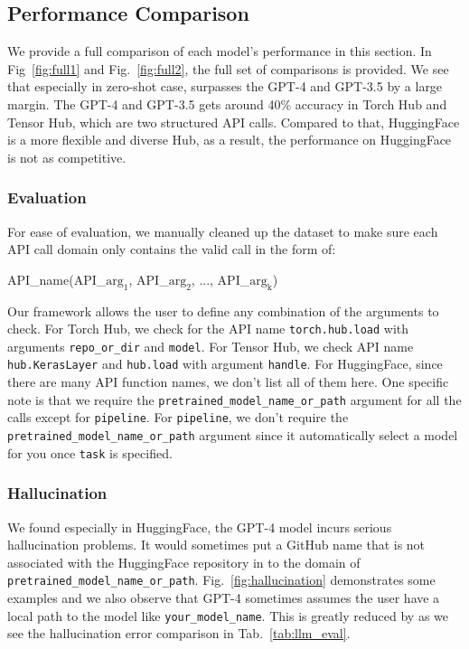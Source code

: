 \subsection{Performance Comparison}
We provide a full comparison of each model's performance in this section. In Fig~\ref{fig:full1} and Fig.~\ref{fig:full2}, the full set of comparisons is provided. We see that especially in zero-shot case, \gorilla{} surpasses the GPT-4 and GPT-3.5 by a large margin. The GPT-4 and GPT-3.5 gets around 40\% accuracy in Torch Hub and Tensor Hub, which are two structured API calls. Compared to that, HuggingFace is a more flexible and diverse Hub, as a result, the performance on HuggingFace is not as competitive.

\subsubsection{Evaluation}
For ease of evaluation, we manually cleaned up the dataset to make sure each API call domain only contains the valid call in the form of: 
\begin{tcolorbox}
\centering
    API\_name(API\_$\mathrm{arg_{1}}$, API\_$\mathrm{arg_{2}}$, ..., API\_$\mathrm{arg_{k}}$)
\end{tcolorbox}
Our framework allows the user to define any combination of the arguments to check. For Torch Hub, we check for the API name \texttt{torch.hub.load} with arguments \texttt{repo\_or\_dir} and \texttt{model}. For Tensor Hub, we check API name \texttt{hub.KerasLayer} and \texttt{hub.load} with argument \texttt{handle}. For HuggingFace, since there are many API function names, we don't list all of them here. One specific note is that we require the \texttt{pretrained\_model\_name\_or\_path} argument for all the calls except for \texttt{pipeline}. For \texttt{pipeline}, we don't require the \texttt{pretrained\_model\_name\_or\_path} argument since it automatically select a model for you once \texttt{task} is specified.  

\subsubsection{Hallucination}
We found especially in HuggingFace, the GPT-4 model incurs serious hallucination problems. It would sometimes put a GitHub name that is not associated with the HuggingFace repository in to the domain of \texttt{pretrained\_model\_name\_or\_path}. Fig.~\ref{fig:hallucination} demonstrates some examples and we also observe that GPT-4 sometimes assumes the user have a local path to the model like \texttt{your\_model\_name}. This is greatly reduced by \gorilla{} as we see the hallucination error comparison in Tab.~\ref{tab:llm_eval}.

